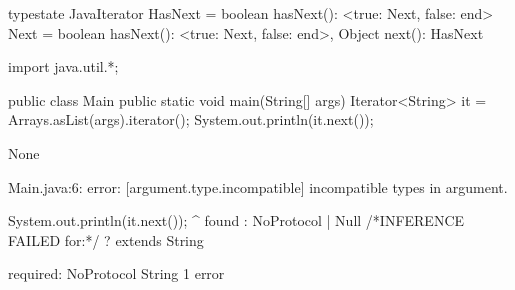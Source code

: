 \begin{code}
typestate JavaIterator {
    HasNext = {
        boolean hasNext(): <true: Next, false: end>
    }
    Next = {
        boolean hasNext(): <true: Next, false: end>,
        Object next(): HasNext
    }
}\end{code}

\begin{code}
import java.util.*;

public class Main {
	public static void main(String[] args) {
    Iterator<String> it = Arrays.asList(args).iterator();
    System.out.println(it.next());
	}
}\end{code}

\lstset{language=,caption=Mungo's output}
\begin{code}
None
\end{code}

\lstset{language=,caption=Our tool's output}
\begin{code}
Main.java:6: error: [argument.type.incompatible] incompatible types in argument.

    System.out.println(it.next());
                              ^
  found   : NoProtocol | Null /*INFERENCE FAILED for:*/ ? extends String

  required: NoProtocol String
1 error
\end{code}


